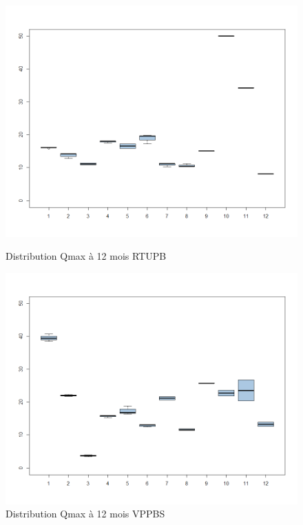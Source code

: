 %
%

\begin{figure}[H]
    \begin{minipage}[c]{.46\linewidth}
        \centering
        \includegraphics[width=1\textwidth]{../Fig/RTUPB/rtupb-qmax-k12-distribution.png}
        \caption{Distribution Qmax à 12 mois RTUPB}
    \end{minipage}
    \hfill%
    \begin{minipage}[c]{.46\linewidth}
        \centering
        \includegraphics[width=1\textwidth]{../Fig/VPPBS/vppbs-qmax-k12-distribution.png}
        \caption{Distribution Qmax à 12 mois VPPBS}
    \end{minipage}
\end{figure}

